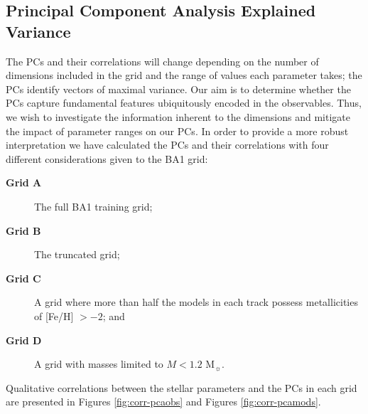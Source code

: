 \subsection{Principal Component Analysis Explained Variance} 
\label{sec:fullPCA}

The PCs and their correlations will change depending on the number of dimensions included in the grid and the range of values each parameter takes; the PCs identify vectors of maximal variance. 
Our aim is to determine whether the PCs capture fundamental features ubiquitously encoded in the observables. 
Thus, we wish to investigate the information inherent to the dimensions and mitigate the impact of parameter ranges on our PCs. 
In order to provide a more robust interpretation we have calculated the PCs and their correlations with four different considerations given to the BA1 grid:
\begin{description}
    \item[\textbf{Grid A}] The full BA1 training grid;
    \item[\textbf{Grid B}] The truncated grid;
    \item[\textbf{Grid C}] A grid where more than half the models in each track possess metallicities of [Fe/H] $> -2$; and
     \item[\textbf{Grid D}] A grid with masses limited to $M < 1.2$ M$_{\sun}$.
\end{description}
Qualitative correlations between the stellar parameters and the PCs in each grid are presented in Figures \ref{fig:corr-pcaobs} and Figures \ref{fig:corr-pcamods}.


